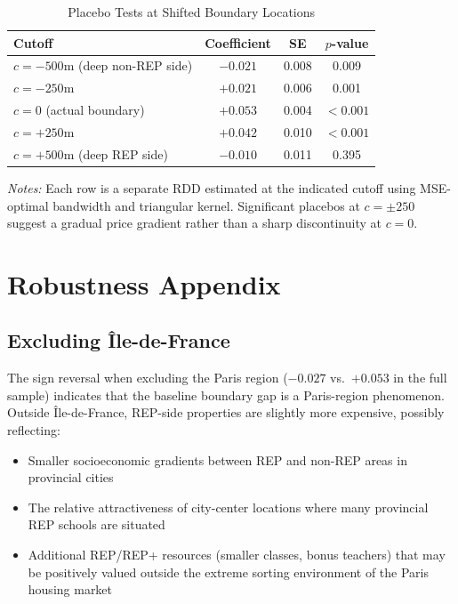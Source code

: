 \documentclass[12pt]{article}
\begin{document}
\begin{table}[htbp]
\centering
\caption{Placebo Tests at Shifted Boundary Locations}
\label{tab:placebo}
\begin{tabular}{lccc}
\toprule
Cutoff & Coefficient & SE & $p$-value \\
\midrule
$c = -500$m (deep non-REP side) & $-0.021$ & 0.008 & 0.009 \\
$c = -250$m & $+0.021$ & 0.006 & 0.001 \\
$c = 0$ (actual boundary) & $+0.053$ & 0.004 & $<0.001$ \\
$c = +250$m & $+0.042$ & 0.010 & $<0.001$ \\
$c = +500$m (deep REP side) & $-0.010$ & 0.011 & 0.395 \\
\bottomrule
\end{tabular}
\begin{tablenotes}
\small
\item \textit{Notes:} Each row is a separate RDD estimated at the indicated cutoff using MSE-optimal bandwidth and triangular kernel. Significant placebos at $c = \pm 250$ suggest a gradual price gradient rather than a sharp discontinuity at $c = 0$.
\end{tablenotes}
\end{table}


\section{Robustness Appendix}\label{app:robustness}

\subsection{Excluding \^{I}le-de-France}

The sign reversal when excluding the Paris region ($-0.027$ vs.\ $+0.053$ in the full sample) indicates that the baseline boundary gap is a Paris-region phenomenon. Outside \^{I}le-de-France, REP-side properties are slightly more expensive, possibly reflecting:
\begin{itemize}
\item Smaller socioeconomic gradients between REP and non-REP areas in provincial cities
\item The relative attractiveness of city-center locations where many provincial REP schools are situated
\item Additional REP/REP+ resources (smaller classes, bonus teachers) that may be positively valued outside the extreme sorting environment of the Paris housing market
\end{itemize}
\end{document}
